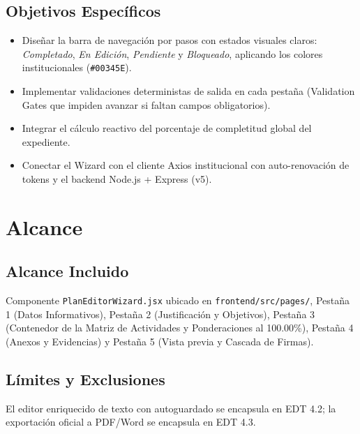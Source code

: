 \documentclass[12pt,a4paper]{article}
\begin{document}
\subsection{Objetivos Específicos}
\begin{itemize}[leftmargin=1.5em, itemsep=1.5pt, topsep=1.5pt]
    \item Diseñar la barra de navegación por pasos con estados visuales claros: \textit{Completado}, \textit{En Edición}, \textit{Pendiente} y \textit{Bloqueado}, aplicando los colores institucionales (\texttt{\#00345E}).
    \item Implementar validaciones deterministas de salida en cada pestaña (Validation Gates que impiden avanzar si faltan campos obligatorios).
    \item Integrar el cálculo reactivo del porcentaje de completitud global del expediente.
    \item Conectar el Wizard con el cliente Axios institucional con auto-renovación de tokens y el backend Node.js + Express (v5).
\end{itemize}

\section{Alcance}

\subsection{Alcance Incluido}
Componente \texttt{PlanEditorWizard.jsx} ubicado en \texttt{frontend/src/pages/}, Pestaña 1 (Datos Informativos), Pestaña 2 (Justificación y Objetivos), Pestaña 3 (Contenedor de la Matriz de Actividades y Ponderaciones al 100.00\%), Pestaña 4 (Anexos y Evidencias) y Pestaña 5 (Vista previa y Cascada de Firmas).

\subsection{Límites y Exclusiones}
El editor enriquecido de texto con autoguardado se encapsula en EDT 4.2; la exportación oficial a PDF/Word se encapsula en EDT 4.3.

\end{document}
